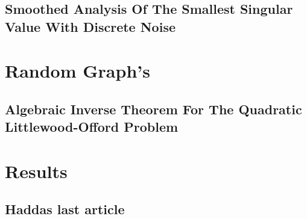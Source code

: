 \documentclass[12pt]{article}
\begin{document}


\subsection{Smoothed Analysis Of The Smallest Singular Value With Discrete Noise}



\newpage
\section{Random Graph's}



\subsection{Algebraic Inverse Theorem For The
Quadratic Littlewood-Offord Problem}



\section{Results}

\subsection{Haddas last article}



\newpage
\printbibliography
\end{document}

